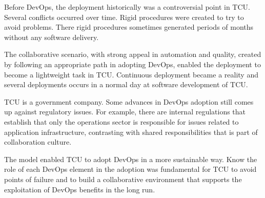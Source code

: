Before DevOps, the deployment historically was a controversial point in TCU.
Several conflicts occurred over time. Rigid procedures were created to try to
avoid problems. There rigid procedures sometimes generated periods of months
without any software delivery.

The collaborative scenario, with strong appeal in automation and quality, created by following an appropriate path in adopting DevOps, enabled the deployment to become a lightweight task in TCU. Continuous deployment became a reality and several deployments occurs in a normal day at software development of TCU.

TCU is a government company. Some advances in DevOps adoption still comes up
against regulatory issues. For example, there are internal regulations that
establish that only the operations sector is responsible for issues related to
application infrastructure, contrasting with shared responsibilities that is
part of collaboration culture.

The model enabled TCU to adopt DevOps in a more sustainable way. Know the role
of each DevOps element in the adoption was fundamental for TCU to avoid points
of failure and to build a collaborative environment that supports the
exploitation of DevOps benefits in the long run.
